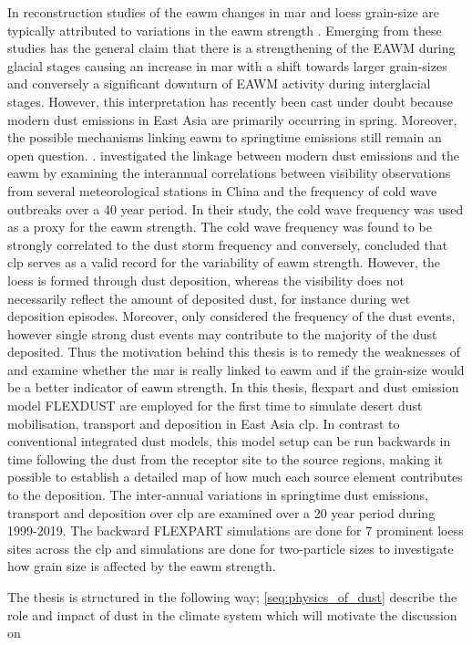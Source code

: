 In reconstruction studies of the \acrfull{eawm} changes in 
\acrfull{mar} and loess grain-size are typically attributed to variations in the \acrshort{eawm} strength \parencite{stevens2007reinterpreting}. Emerging from these studies has the general claim that there is a strengthening of the EAWM during glacial stages causing an increase in \acrshort{mar} with a shift towards larger grain-sizes and conversely a significant downturn of EAWM activity during interglacial stages. However, this interpretation has recently been cast under doubt because modern dust emissions in East Asia are primarily occurring in spring. Moreover, the possible mechanisms linking \acrshort{eawm} to springtime emissions still remain an open question. \parencite{roe2009interpretation}. \textcite{wyrwoll2016cold} investigated the linkage between modern dust emissions and the \acrshort{eawm} by examining the interannual correlations between visibility observations from several meteorological stations in China and the frequency of cold wave outbreaks over a 40 year period. In their study, the cold wave frequency was used as a proxy for the \acrshort{eawm} strength. The cold wave frequency was found to be strongly correlated to the dust storm frequency and conversely, \textcite{wyrwoll2016cold} concluded that \acrshort{clp} serves as a valid record for the variability of \acrshort{eawm} strength. However, the loess is formed through dust deposition, whereas the visibility does not necessarily reflect the amount of deposited dust, for instance during wet deposition episodes. Moreover, \textcite{wyrwoll2016cold} only considered the frequency of the dust events, however single strong dust events may contribute to the majority of the dust deposited. Thus the motivation behind this thesis is to remedy the weaknesses of \textcite{wyrwoll2016cold} and examine whether the \acrshort{mar} is really linked to \acrshort{eawm} and if the grain-size would be a better indicator of \acrshort{eawm} strength. 
In this thesis, \acrfull{flexpart} \parencite{Flexpart10.4_ref} and dust emission model FLEXDUST \parencite{flexdust_ref_2016} are employed for the first time to simulate desert dust mobilisation, transport and deposition in East Asia \acrshort{clp}. In contrast to conventional integrated dust models, this model setup can be run backwards in time following the dust from the receptor site to the source regions, making it possible to establish a detailed map of how much each source element contributes to the deposition. The inter-annual variations in springtime dust emissions, transport and deposition over \acrshort{clp} are examined over a 20 year period during 1999-2019. The backward FLEXPART simulations are done for 7 prominent loess sites across the \acrshort{clp} and simulations are done for two-particle sizes to investigate how grain size is affected by the \acrshort{eawm} strength. 

The thesis is structured in the following way; \cref{seq:physics_of_dust} describe the role and impact of dust in the climate system which will motivate the discussion on
 

